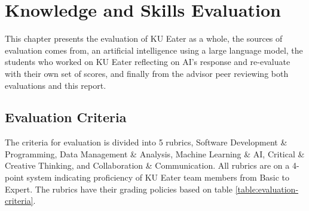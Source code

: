 \chapter{Knowledge and Skills Evaluation}
\label{chap:evaluation}
This chapter presents the evaluation of KU Eater as a whole, the sources of evaluation comes from, an artificial intelligence using a large language model,
the students who worked on KU Eater reflecting on AI's response and re-evaluate with their own set of scores, and finally from the advisor peer reviewing both
evaluations and this report.

\section{Evaluation Criteria}
\label{section:evaluation-criteria}
The criteria for evaluation is divided into 5 rubrics, Software Development \& Programming, Data Management \& Analysis,
Machine Learning \& AI, Critical \& Creative Thinking, and Collaboration \& Communication. All rubrics are on a 4-point system indicating
proficiency of KU Eater team members from Basic to Expert. The rubrics have their grading policies based on table \ref{table:evaluation-criteria}.

